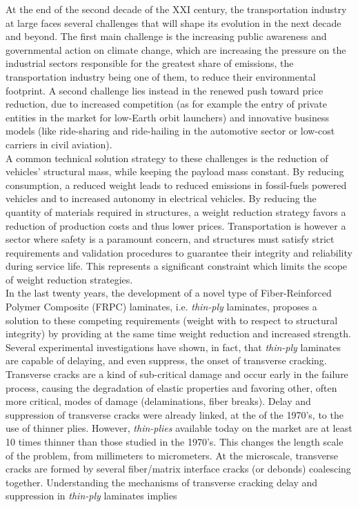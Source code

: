 At the end of the second decade of the XXI century, the transportation industry at large faces several challenges that will shape its evolution in the next decade and beyond. The first main challenge is the increasing public awareness and governmental action on climate change, which are increasing the pressure on the industrial sectors responsible for the greatest share of emissions, the transportation industry being one of them, to reduce their environmental footprint. A second challenge lies instead in the renewed push toward price reduction, due to increased competition (as for example the entry of private entities in the market for low-Earth orbit launchers) and innovative business models (like ride-sharing and ride-hailing in the automotive sector or low-cost carriers in civil aviation).\\
A common technical solution strategy to these challenges is the reduction of vehicles' structural mass, while keeping the payload mass constant. By reducing consumption, a reduced weight leads to reduced emissions in fossil-fuels powered vehicles and to increased autonomy in electrical vehicles. By reducing the quantity of materials required in structures, a weight reduction strategy favors a reduction of production costs and thus lower prices. Transportation is however a sector where safety is a paramount concern, and structures must satisfy strict requirements and validation procedures to guarantee their integrity and reliability during service life. This represents a significant constraint which limits the scope of weight reduction strategies.\\
In the last twenty years, the development of a novel type of Fiber-Reinforced Polymer Composite (FRPC) laminates, i.e. \emph{thin-ply} laminates, proposes a solution to these competing requirements (weight with to respect to structural integrity) by providing at the same time weight reduction and increased strength. Several experimental investigations have shown, in fact, that \emph{thin-ply} laminates are capable of delaying, and even suppress, the onset of transverse cracking. Transverse cracks are a kind of sub-critical damage and occur early in the failure process, causing the degradation of elastic properties and favoring other, often more critical, modes of damage (delaminations, fiber breaks). Delay and suppression of transverse cracks were already linked, at the of the 1970's, to the use of thinner plies. However, \emph{thin-plies} available today on the market are at least 10 times thinner than those studied in the 1970's. This changes the length scale of the problem, from millimeters to micrometers. At the microscale, transverse cracks are formed by several fiber/matrix interface cracks (or debonds) coalescing together. Understanding the mechanisms of transverse cracking delay and suppression in \emph{thin-ply} laminates implies 
